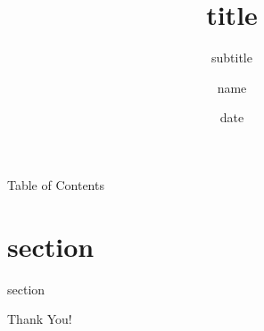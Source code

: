 \documentclass{beamer}
\title{title}
\subtitle{subtitle}
\author{name}
\institute{institution}
\date{date}
\begin{document}
\begin{frame}
    \titlepage
\end{frame}

\begin{frame}{Table of Contents}
    \tableofcontents
\end{frame}

\section{section}

\begin{frame}
    \centering
    \Huge{section}
\end{frame}

\begin{frame}
    \centering
    \Huge{Thank You!}
\end{frame}
\end{document}
